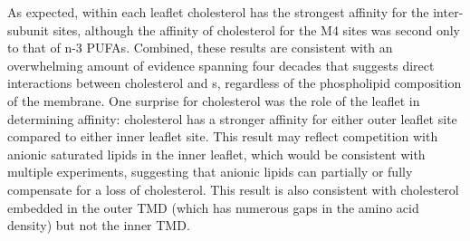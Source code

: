As expected, within each leaflet cholesterol has the strongest affinity for the inter-subunit sites, although the affinity of cholesterol for the M4 sites was second only to that of n-3 PUFAs. Combined, these results are consistent with an overwhelming amount of evidence spanning four decades that suggests direct interactions between cholesterol and \nachr s, regardless of the phospholipid composition of the membrane.  One surprise for cholesterol was the role of the leaflet in determining affinity: cholesterol has a stronger affinity for either outer leaflet site compared to either inner leaflet site. This result may reflect competition with anionic saturated lipids in the inner leaflet, which would be consistent with multiple experiments\cite{Baenziger2000,Wenz2005,Hamouda2006,Thompson2020}, suggesting that anionic lipids can partially or fully compensate for a loss of cholesterol.  This result is also consistent with cholesterol embedded\cite{Brannigan2008} in the outer TMD (which has numerous gaps in the amino acid density) but not the inner TMD. 


